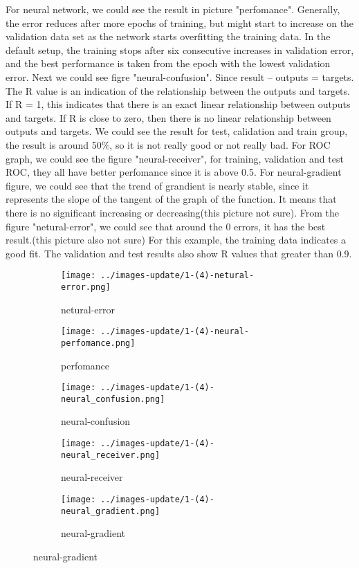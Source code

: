 \documentclass[]{article}
\begin{document}
For neural network, we could see the result in picture "perfomance".  Generally, the error reduces after more epochs of training, but might start to increase on the validation data set as the network starts overfitting the training data. In the default setup, the training stops after six consecutive increases in validation error, and the best performance is taken from the epoch with the lowest validation error. Next we could see figre "neural-confusion". Since result – outputs = targets. The R value is an indication of the relationship between the outputs and targets. If R = 1, this indicates that there is an exact linear relationship between outputs and targets. If R is close to zero, then there is no linear relationship between outputs and targets. We could see the result for test, calidation and train group, the result is around 50\%, so it is not really good or not really bad. For ROC graph, we could see the figure "neural-receiver", for training, validation and test ROC, they all have better perfomance since it is above 0.5. For neural-gradient
figure, we could see that the trend of grandient is nearly stable, since it represents the slope of the tangent of the graph of the function. It means that there is no significant increasing or decreasing(this picture not sure). From the figure "netural-error", we could see that around the 0 errors, it has the best result.(this picture also not sure)
For this example, the training data indicates a good fit. The validation and test results also show R values that greater than 0.9.
\begin{figure}[p]
	\centering
	\begin{subfigure}{.5\textwidth}
		\centering
		\texttt{[image: ../images-update/1-(4)-netural-error.png]}
		\caption{netural-error}
		\label{fig:sub1}
	\end{subfigure}
	
	\begin{subfigure}{.5\textwidth}
		\centering
		\texttt{[image: ../images-update/1-(4)-neural-perfomance.png]}
		\caption{perfomance}
		\label{fig:sub1}
	\end{subfigure}
	
	\begin{subfigure}{.5\textwidth}
		\centering
		\texttt{[image: ../images-update/1-(4)-neural\_confusion.png]}
		\caption{neural-confusion}
		\label{fig:sub1}
	\end{subfigure}
	
	\begin{subfigure}{.5\textwidth}
		\centering
		\texttt{[image: ../images-update/1-(4)-neural\_receiver.png]}
		\caption{neural-receiver}
		\label{fig:sub1}
	\end{subfigure}
	
	\begin{subfigure}{.5\textwidth}
		\centering
		\texttt{[image: ../images-update/1-(4)-neural\_gradient.png]}
		\caption{neural-gradient}
		\label{fig:sub1}
	\end{subfigure}
	
\end{figure}
\end{document}
